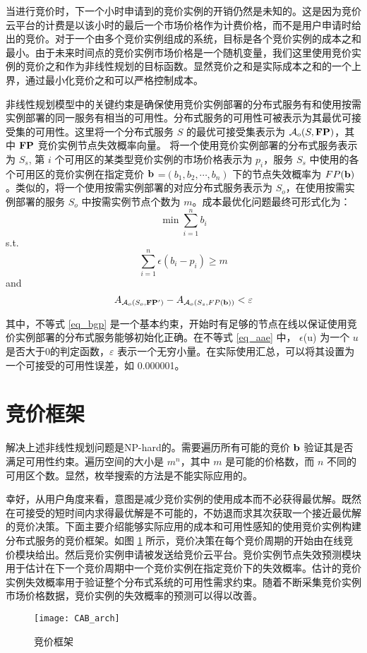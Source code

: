 当进行竞价时，下一个小时申请到的竞价实例的开销仍然是未知的。这是因为竞价云平台的计费是以该小时的最后一个市场价格作为计费价格，而不是用户申请时给出的竞价。对于一个由多个竞价实例组成的系统，目标是各个竞价实例的成本之和最小。由于未来时间点的竞价实例市场价格是一个随机变量，我们这里使用竞价实例的竞价之和作为非线性规划的目标函数。显然竞价之和是实际成本之和的一个上界，通过最小化竞价之和可以严格控制成本。

非线性规划模型中的关键约束是确保使用竞价实例部署的分布式服务有和使用按需实例部署的同一服务有相当的可用性。分布式服务的可用性可被表示为其最优可接受集的可用性。这里将一个分布式服务 $S$ 的最优可接受集表示为 $\mathcal{A}_{o}(S, \bf{FP})$，其中 $\bf{FP}$ 竞价实例节点失效概率向量。 将一个使用竞价实例部署的分布式服务表示为 $S_s$, 第 $i$ 个可用区的某类型竞价实例的市场价格表示为 $p_i$，服务 $S_s$ 中使用的各个可用区的竞价实例在指定竞价 $\bf b$ =$ (b_1, b_2, \cdots, b_n)$ 下的节点失效概率为 $FP(\bf b)$。类似的，将一个使用按需实例部署的对应分布式服务表示为 $S_o$，在使用按需实例部署的服务 $S_o$ 中按需实例节点个数为 $m$。成本最优化问题最终可形式化为：
\begin{equation}
\min \sum_{i=1}^n b_i
\end{equation}
s.t.
\begin{equation}\label{eq_bgp}
\sum_{i=1}^n {\epsilon(b_i - p_i)} \geq m
\end{equation}
and
\begin{equation}\label{eq_aae}
A_{\mathcal{A}_{o}(S_o, {\bf{FP^{\prime}}})} - A_{\mathcal{A}_{o}(S_s, FP(\bf b))} < \varepsilon
\end{equation}

其中，不等式 \eqref{eq_bgp} 是一个基本约束，开始时有足够的节点在线以保证使用竞价实例部署的分布式服务能够初始化正确。在不等式 \eqref{eq_aae} 中， $\epsilon$(u) 为一个 $u$ 是否大于0的判定函数，$\varepsilon$ 表示一个无穷小量。在实际使用汇总，可以将其设置为一个可接受的可用性误差，如 0.000001。

\section{竞价框架}
\label{jupiter-framework}
解决上述非线性规划问题是NP-hard的。需要遍历所有可能的竞价 $\bf b$ 验证其是否满足可用性约束。遍历空间的大小是 $m^n$，其中 $m$ 是可能的价格数，而 $n$ 不同的可用区个数。显然，枚举搜索的方法是不能实际应用的。

幸好，从用户角度来看，意图是减少竞价实例的使用成本而不必获得最优解。既然在可接受的短时间内求得最优解是不可能的，不妨退而求其次获取一个接近最优解的竞价决策。下面主要介绍能够实际应用的成本和可用性感知的使用竞价实例构建分布式服务的竞价框架。如图 \ref{figure:framework} 所示，竞价决策在每个竞价周期的开始由在线竞价模块给出。然后竞价实例申请被发送给竞价云平台。竞价实例节点失效预测模块用于估计在下一个竞价周期中一个竞价实例在指定竞价下的失效概率。估计的竞价实例失效概率用于验证整个分布式系统的可用性需求约束。随着不断采集竞价实例市场价格数据，竞价实例的失效概率的预测可以得以改善。
\begin{figure}
  \centering
  \texttt{[image: CAB\_arch]}
  \caption{竞价框架}
  \label{figure:framework}
\end{figure}

